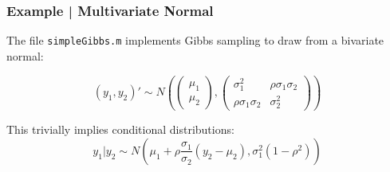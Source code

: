 \documentclass[11pt, aspectratio=169]{beamer}
\begin{document}
\begin{frame}[c]\frametitle{Example | Multivariate Normal}
    
The file {\tt simpleGibbs.m} implements Gibbs sampling to draw from a bivariate normal: 

$$(y_1, y_2)' \sim N\left( \begin{pmatrix} \mu_1 \\ \mu_2 \end{pmatrix}, \begin{pmatrix} \sigma_1^2 & \rho \sigma_1 \sigma_2 \\ \rho \sigma_1 \sigma_2 & \sigma_2^2 \end{pmatrix} \right) $$

This trivially implies conditional distributions: 
$$y_1 | y_2 \sim N(\mu_1 + \rho \frac{\sigma_1}{\sigma_2}(y_2 - \mu_2), \sigma_1^2(1 - \rho^2))$$



\end{frame}
\end{document}
